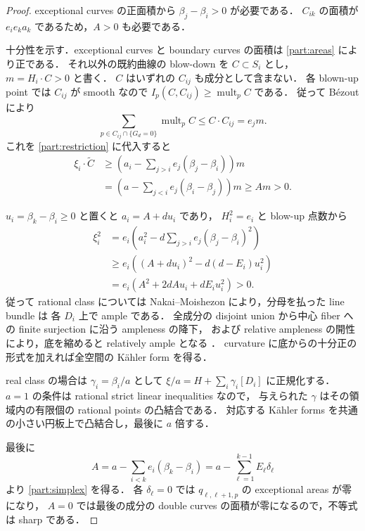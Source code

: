 \begin{proof}
exceptional curves の正面積から $\beta_j-\beta_i>0$ が必要である．
$C_{ik}$ の面積が $e_i e_k a_k$ であるため，$A>0$ も必要である．

十分性を示す．exceptional curves と boundary curves の面積は
\eqref{part:areas} により正である．
それ以外の既約曲線の blow-down を $C\subset S_i$ とし，
$m=H_i\cdot C>0$ と書く．
$C$ はいずれの $C_{ij}$ も成分として含まない．
各 blown-up point では $C_{ij}$ が smooth なので
$I_p(C,C_{ij})\geq\operatorname{mult}_pC$ である．
従って Bézout により
\[
 \sum_{p\in C_{ij}\cap\{G_d=0\}}\operatorname{mult}_pC
   \leq C\cdot C_{ij}=e_jm.
\]
これを \eqref{part:restriction} に代入すると
\begin{align*}
 \xi_i\cdot\widetilde C
 &\geq\left(a_i-\sum_{j>i}e_j(\beta_j-\beta_i)\right)m\\
 &=\left(a-\sum_{j<i}e_j(\beta_i-\beta_j)\right)m
 \geq A m>0.
\end{align*}

$u_i=\beta_k-\beta_i\geq0$ と置くと $a_i=A+du_i$ であり，
$H_i^2=e_i$ と blow-up 点数から
\begin{align*}
 \xi_i^2
 &=e_i\left(a_i^2-d\sum_{j>i}e_j(\beta_j-\beta_i)^2\right)\\
 &\geq e_i\left((A+du_i)^2-d(d-E_i)u_i^2\right)\\
 &=e_i\left(A^2+2dAu_i+dE_i u_i^2\right)>0.
\end{align*}
従って rational class については Nakai--Moishezon
\cite[Chapter V, Theorem 1.10]{Hartshorne} により，分母を払った line bundle は
各 $D_i$ 上で ample である．
全成分の disjoint union から中心 fiber への finite surjection に沿う ampleness の降下，
および relative ampleness の開性により，底を縮めると relatively ample となる
\cite{StacksAmpleness}．
curvature に底からの十分正の形式を加えれば全空間の Kähler form を得る．

real class の場合は $\gamma_i=\beta_i/a$ として
$\xi/a=H+\sum_i\gamma_i[D_i]$ に正規化する．
$a=1$ の条件は rational strict linear inequalities なので，
与えられた $\gamma$ はその領域内の有限個の rational points の凸結合である．
対応する Kähler forms を共通の小さい円板上で凸結合し，最後に $a$ 倍する．

最後に
\[
 A=a-\sum_{i<k}e_i(\beta_k-\beta_i)
   =a-\sum_{\ell=1}^{k-1}E_\ell\delta_\ell
\]
より \eqref{part:simplex} を得る．
各 $\delta_\ell=0$ では $q_{\ell,\ell+1,p}$ の exceptional areas が零になり，
$A=0$ では最後の成分の double curves の面積が零になるので，不等式は sharp である．
\end{proof}

